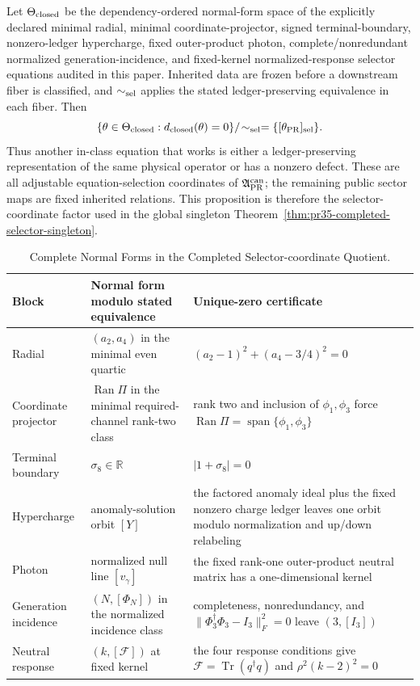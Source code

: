 \begin{proposition}
\label{prop:pr35-current-closed-equation-quotient}
Let $\Theta_{\rm closed}$ be the dependency-ordered normal-form space of the explicitly declared
minimal radial, minimal coordinate-projector, signed terminal-boundary, nonzero-ledger hypercharge, fixed outer-product photon, complete/nonredundant normalized generation-incidence, and fixed-kernel normalized-response selector equations audited in this paper.  Inherited data are frozen before a downstream fiber is classified, and $\sim_{\rm sel}$ applies the stated ledger-preserving
equivalence in each fiber.  Then
\begin{equation}
 \{\theta\in\Theta_{\rm closed}:d_{\rm closed}(\theta)=0\}
 /\!\sim_{\rm sel}
 =\{[\theta_{\rm PR}]_{\rm sel}\}.
 \label{eq:pr35-current-closed-equation-singleton}
\end{equation}
Thus another in-class equation that works is either a ledger-preserving representation of the same physical operator or has a nonzero defect.  These are all adjustable equation-selection coordinates of
$\mathfrak A_{\rm PR}^{\rm can}$; the remaining public sector maps are fixed inherited relations.  This proposition is therefore the selector-coordinate factor used in the global singleton
Theorem~\ref{thm:pr35-completed-selector-singleton}.
\end{proposition}

\begin{table}[H]
\centering
\caption{Complete Normal Forms in the Completed Selector-coordinate Quotient.}
\label{tab:pr35-closed-selector-normal-forms}
\begin{tabularx}{\textwidth}{@{}p{}p{}X@{}}
\toprule
Block & Normal form modulo stated equivalence & Unique-zero certificate \\
\midrule
Radial & $(a_2,a_4)$ in the minimal even quartic & $(a_2-1)^2+(a_4-3/4)^2=0$ \\
Coordinate projector & $\operatorname{Ran}\Pi$ in the minimal required-channel rank-two class & rank two and inclusion of $\phi_1,\phi_3$ force $\operatorname{Ran}\Pi=\operatorname{span}\{\phi_1,\phi_3\}$ \\
Terminal boundary & $\sigma_8\in\mathbb R$ & $|1+\sigma_8|=0$ \\
Hypercharge & anomaly-solution orbit $[Y]$ & the factored anomaly ideal plus the fixed nonzero charge ledger leaves one orbit modulo normalization and up/down relabeling \\
Photon & normalized null line $[v_\gamma]$ & the fixed rank-one outer-product neutral matrix has a one-dimensional kernel \\
Generation incidence & $(N,[\Phi_N])$ in the normalized incidence class & completeness, nonredundancy, and $\|\Phi_3^\dagger\Phi_3-I_3\|_F^2=0$ leave $(3,[I_3])$ \\
Neutral response & $(k,[\mathcal F])$ at fixed kernel & the four response conditions give $\mathcal F=\operatorname{Tr}(q^\dagger q)$ and $\rho^2(k-2)^2=0$ \\
\bottomrule
\end{tabularx}
\end{table}

